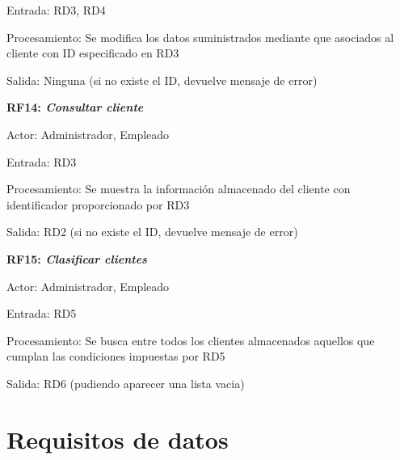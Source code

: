 \documentclass[paper=a4, fontsize=11pt, spanish]{scrartcl}
\begin{document}
Entrada: RD3, RD4

Procesamiento: Se modifica los datos suministrados mediante que asociados al cliente con ID especificado en RD3

Salida: Ninguna (si no existe el ID, devuelve mensaje de error)

\setlength{\parindent}{0em}
\textbf{RF14: \textit{Consultar cliente}}
\setlength{\parindent}{2em}

Actor: Administrador, Empleado

Entrada: RD3

Procesamiento: Se muestra la información almacenado del cliente con identificador proporcionado por RD3

Salida:  RD2 (si no existe el ID, devuelve mensaje de error)

\setlength{\parindent}{0em}
\textbf{RF15: \textit{Clasificar clientes}}
\setlength{\parindent}{2em}

Actor: Administrador, Empleado

Entrada: RD5

Procesamiento:  Se busca entre todos los clientes almacenados aquellos que cumplan las condiciones impuestas por RD5

Salida: RD6 (pudiendo aparecer una lista vacia)

\section{Requisitos de datos}
\end{document}
